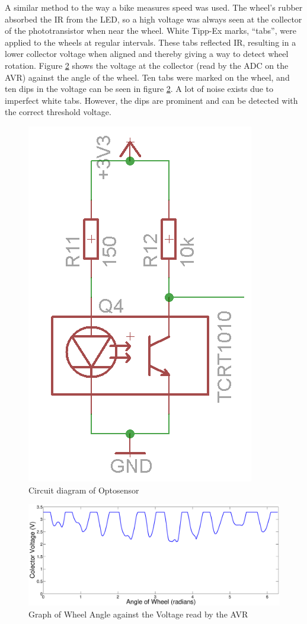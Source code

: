 A similar method to the way a bike measures speed was used. The wheel's rubber absorbed the IR from the LED, so a high voltage was always seen at the collector of the phototransistor when near the wheel. White Tipp-Ex marks, ``tabs'', were applied to the wheels at regular intervals. These tabs reflected IR, resulting in a lower collector voltage when aligned and thereby giving a way to detect wheel rotation. Figure \ref{Graph:WheelVoltage} shows the voltage at the collector (read by the ADC on the AVR) against the angle of the wheel. Ten tabs were marked on the wheel, and ten dips in the voltage can be seen in figure \ref{Graph:WheelVoltage}. A lot of noise exists due to imperfect white tabs. However, the dips are prominent and can be detected with the correct threshold voltage.

\begin{figure}
\centering
\includegraphics[scale=0.5]{Figures/TCRT_Circuit.png}
\caption{Circuit diagram of Optosensor}
\label{Circuit:TCRT1010}
\end{figure}

\begin{figure}
\includegraphics[width = \textwidth]{Figures/WheelVoltageGraph.eps}
\caption{Graph of Wheel Angle against the Voltage read by the AVR}
\label{Graph:WheelVoltage}
\end{figure}
 

